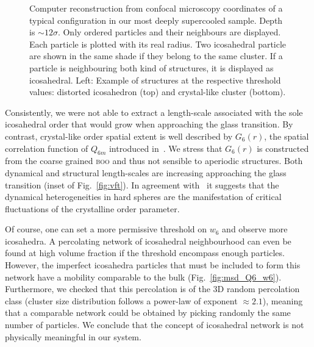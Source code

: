 \documentclass{revtex4-1}
\begin{document}
\begin{figure}
	\caption{Computer reconstruction from confocal microscopy coordinates of a typical configuration in our most deeply supercooled sample. Depth is $\sim 12\sigma$. Only ordered particles and their neighbours are displayed. Each particle is plotted with its real radius. Two icosahedral particle are shown in the same shade if they belong to the same cluster. If a particle is neighbouring both kind of structures, it is displayed as icosahedral. Left: Example of structures at the respective threshold values: distorted icosahedron (top) and crystal-like cluster (bottom).}
	\label{fig:3D}
\end{figure}

Consistently, we were not able to extract a length-scale associated with the sole icosahedral order that would grow when approaching the glass transition. By contrast, crystal-like order spatial extent is well described by $G_6(r)$, the spatial correlation function of $Q_{6 m}$ introduced in~\citep{tanaka2010critical}. We stress that $G_6(r)$ is constructed from the coarse grained \textsc{boo} and thus not sensible to aperiodic structures. Both dynamical and structural length-scales are increasing approaching the glass transition (inset of Fig.~\ref{fig:vft}). In agreement with~\citep{tanaka2010critical} it suggests that the dynamical heterogeneities in hard spheres are the manifestation of critical fluctuations of the crystalline order parameter.

Of course, one can set a more permissive threshold on $w_6$ and observe more icosahedra. A percolating network of icosahedral neighbourhood can even be found at high volume fraction if the threshold encompass enough particles. However, the imperfect icosahedra particles that must be included to form this network have a mobility comparable to the bulk (Fig.~\ref{fig:msd_Q6_w6}). Furthermore, we checked that this percolation is of the 3D random percolation class (cluster size distribution follows a power-law of exponent $\approx 2.1$), meaning that a comparable network could be obtained by picking randomly the same number of particles. We conclude that the concept of icosahedral network is not physically meaningful in our system.
\end{document}
